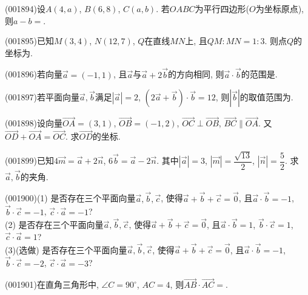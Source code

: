 \item (001894)设$A(4,a)$, $B(6,8)$, $C(a,b)$. 若$OABC$为平行四边形($O$为坐标原点), 则$a-b=$.
\item (001895)已知$M(3,4)$, $N(12,7)$, $Q$在直线$MN$上, 且$QM:MN=1:3$. 则点$Q$的坐标为.
\item (001896)若向量$\overrightarrow{a}=(-1,1)$, 且$\overrightarrow{a}$与$\overrightarrow{a}+2\overrightarrow{b}$的方向相同, 则$\overrightarrow{a}\cdot\overrightarrow{b}$的范围是.
\item (001897)若平面向量$\overrightarrow{a},\overrightarrow{b}$满足$|\overrightarrow{a}|=2$, $(2\overrightarrow{a}+\overrightarrow{b})\cdot \overrightarrow{b}=12$, 则$|\overrightarrow{b}|$的取值范围为.
\item (001898)设向量$\overrightarrow{OA}=(3,1)$, $\overrightarrow{OB}=(-1,2)$, $\overrightarrow{OC}\perp \overrightarrow{OB}$, $\overrightarrow{BC}\parallel \overrightarrow{OA}$. 又$\overrightarrow{OD}+\overrightarrow{OA}=\overrightarrow{OC}$. 求$\overrightarrow{OD}$的坐标.
\item (001899)已知$4\overrightarrow{m}=\overrightarrow{a}+2\overrightarrow{n}$, $6\overrightarrow{b}=\overrightarrow{a}-2\overrightarrow{n}$. 其中$|\overrightarrow{a}|=3$, $|\overrightarrow{m}|=\dfrac{\sqrt{13}}{2}$, $|\overrightarrow{n}|=\dfrac{5}{2}$.
求$\overrightarrow{a},\overrightarrow{b}$的夹角.
\item (001900)(1) 是否存在三个平面向量$\overrightarrow{a},\overrightarrow{b},\overrightarrow{c}$, 使得$\overrightarrow{a}+\overrightarrow{b}+\overrightarrow{c}=\overrightarrow{0}$, 且$\overrightarrow{a}\cdot\overrightarrow{b}=-1$, $\overrightarrow{b}\cdot\overrightarrow{c}=-1$, $\overrightarrow{c}\cdot \overrightarrow{a}=-1$?\\ 
(2) 是否存在三个平面向量$\overrightarrow{a},\overrightarrow{b},\overrightarrow{c}$, 使得$\overrightarrow{a}+\overrightarrow{b}+\overrightarrow{c}=\overrightarrow{0}$, 且$\overrightarrow{a}\cdot\overrightarrow{b}=1$, $\overrightarrow{b}\cdot\overrightarrow{c}=1$, $\overrightarrow{c}\cdot \overrightarrow{a}=1$?\\ 
(3)(选做) 是否存在三个平面向量$\overrightarrow{a},\overrightarrow{b},\overrightarrow{c}$, 使得$\overrightarrow{a}+\overrightarrow{b}+\overrightarrow{c}=\overrightarrow{0}$, 且$\overrightarrow{a}\cdot\overrightarrow{b}=-1$, $\overrightarrow{b}\cdot\overrightarrow{c}=-2$, $\overrightarrow{c}\cdot \overrightarrow{a}=-3$?
\item (001901)在直角三角形中, $\angle C=90^\circ$, $AC=4$, 则$\overrightarrow{AB}\cdot \overrightarrow{AC}=$.
